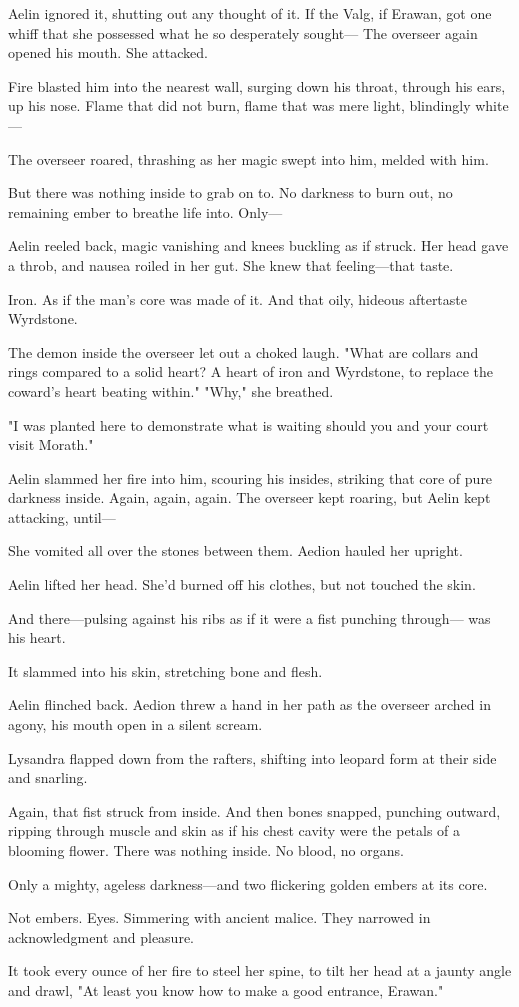 Aelin ignored it, shutting out any thought of it. If the Valg, if Erawan, got one whiff that she possessed what he so desperately sought--- The overseer again opened his mouth. She attacked.

Fire blasted him into the nearest wall, surging down his throat, through his ears, up his nose. Flame that did not burn, flame that was mere light, blindingly white---

The overseer roared, thrashing as her magic swept into him, melded with him.

But there was nothing inside to grab on to. No darkness to burn out, no remaining ember to breathe life into. Only---

Aelin reeled back, magic vanishing and knees buckling as if struck. Her head gave a throb, and nausea roiled in her gut. She knew that feeling---that taste.

Iron. As if the man's core was made of it. And that oily, hideous aftertaste  Wyrdstone.

The demon inside the overseer let out a choked laugh. "What are collars and rings compared to a solid heart? A heart of iron and Wyrdstone, to replace the coward's heart beating within." "Why," she breathed.

"I was planted here to demonstrate what is waiting should you and your court visit Morath."

Aelin slammed her fire into him, scouring his insides, striking that core of pure darkness inside. Again, again, again. The overseer kept roaring, but Aelin kept attacking, until---

She vomited all over the stones between them. Aedion hauled her upright.

Aelin lifted her head. She'd burned off his clothes, but not touched the skin.

And there---pulsing against his ribs as if it were a fist punching through--- was his heart.

It slammed into his skin, stretching bone and flesh.

Aelin flinched back. Aedion threw a hand in her path as the overseer arched in agony, his mouth open in a silent scream.

Lysandra flapped down from the rafters, shifting into leopard form at their side and snarling.

Again, that fist struck from inside. And then bones snapped, punching outward, ripping through muscle and skin as if his chest cavity were the petals of a blooming flower. There was nothing inside. No blood, no organs.

Only a mighty, ageless darkness---and two flickering golden embers at its core.

Not embers. Eyes. Simmering with ancient malice. They narrowed in acknowledgment and pleasure.

It took every ounce of her fire to steel her spine, to tilt her head at a jaunty angle and drawl, "At least you know how to make a good entrance, Erawan."
